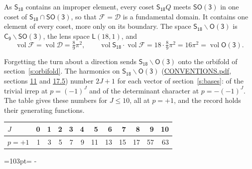 \documentclass[10pt,a4paper]{article}
\newcommand{\needspace}[1]{\par\penalty-100\begingroup\dimen0=#1\relax\dimen2=\pagegoal
  \advance\dimen2-\pagetotal\ifdim\dimen0>\dimen2\relax\ifdim\dimen2>0pt\vfil\break\fi\fi
  \endgroup}
\numberwithin{equation}{section}
\newcommand{\grp}[1]{\mathsf{#1}}
\newcommand{\vol}{\operatorname{vol}}
\newcommand{\fcell}{\mathcal{D}}
\newcommand{\fdomain}{\mathcal{F}}
\newcommand{\lensspace}[2]{\mathsf{L}(#1, #2)}
\begin{document}
\leavevmode\label{n:set.fundamental}As $\grp{S_{18}}$ contains an improper element, every coset $\grp{S_{18}}Q$ meets \href{SO3.pdf}{$\grp{SO(3)}$} in one coset of $\grp{S_{18}} \cap \grp{SO(3)}$, so that $\fdomain = \fcell$ is a fundamental domain. It contains one element of every coset, more only on its boundary.
\leavevmode\label{n:set.lens}The space $\grp{S_{18}}\backslash\grp{O(3)}$ is $\grp{C_{9}}\backslash\grp{SO(3)}$, the lens space $\lensspace{18}{1}$, and
\begin{equation}\label{e:volume}\vol\fdomain = \vol\fcell = \tfrac{8}{9}\pi^2,\qquad \vol\grp{S_{18}}\cdot\vol\fdomain = 18\cdot \tfrac{8}{9}\pi^2 = 16\pi^2 = \vol\grp{O(3)}.\end{equation}

Forgetting the turn about a direction sends $\grp{S_{18}}\backslash\grp{O(3)}$ onto the orbifold of section~\ref{s:orbifold}.
The harmonics on $\grp{S_{18}}\backslash\grp{O(3)}$ (\href{../../CONVENTIONS.pdf}{CONVENTIONS.pdf}, sections \href{../../CONVENTIONS.pdf\#conv.11}{11} and \href{../../CONVENTIONS.pdf\#conv.17.5}{17.5}) number $2J + 1$ for each vector of section~\ref{s:bases}: of the trivial irrep at $p = (-1)^J$ and of the determinant character at $p = -(-1)^J$. The table gives these numbers for $J \le 10$, all at $p = +1$, and the record holds their generating functions.
{\small\setlength{\tabcolsep}{4pt}\begin{longtable}{@{}lrrrrrrrrrrr@{}}\toprule
$J$ & 0 & 1 & 2 & 3 & 4 & 5 & 6 & 7 & 8 & 9 & 10\\\midrule\endhead
\bottomrule\endfoot\endlastfoot
$p = +1$ & 1 & 3 & 5 & 7 & 9 & 11 & 13 & 15 & 17 & 57 & 63\\
\bottomrule\end{longtable}}
\needspace{103pt}
\end{document}
